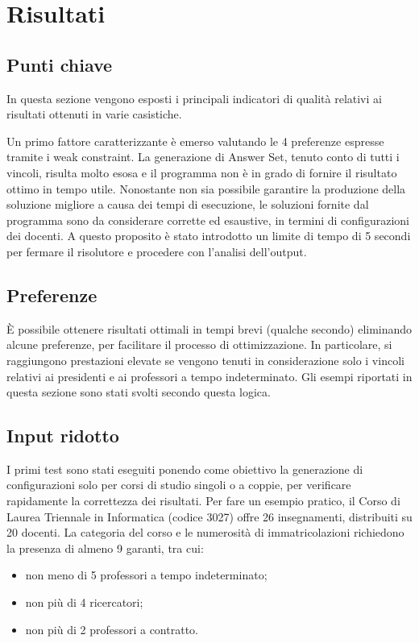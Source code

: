 \section{Risultati}

\subsection{Punti chiave}
In questa sezione vengono esposti i principali indicatori di qualità 
relativi ai risultati ottenuti in varie casistiche.

Un primo fattore caratterizzante è emerso valutando le 4 preferenze espresse 
tramite i weak constraint. La generazione di Answer Set,
tenuto conto di tutti i vincoli, risulta molto esosa e il programma non è 
in grado di fornire il risultato ottimo in tempo utile.
Nonostante non sia possibile garantire la produzione della soluzione migliore a causa
dei tempi di esecuzione, le soluzioni fornite dal programma sono da considerare 
corrette ed esaustive, in termini di configurazioni dei docenti.
A questo proposito è stato introdotto un limite di tempo di 5 secondi per 
fermare il risolutore e procedere con l'analisi dell'output.

\subsection{Preferenze}
È possibile ottenere risultati ottimali in tempi brevi (qualche secondo) eliminando alcune 
preferenze, per facilitare il processo di ottimizzazione. In particolare, si raggiungono
prestazioni elevate se vengono tenuti in considerazione solo i vincoli relativi ai 
presidenti e ai professori a tempo indeterminato.
Gli esempi riportati in questa sezione sono stati svolti secondo questa logica.

\subsection{Input ridotto}
I primi test sono stati eseguiti ponendo come obiettivo la generazione di 
configurazioni solo per corsi di studio singoli o a coppie, per verificare 
rapidamente la correttezza dei risultati.
Per fare un esempio pratico, il Corso di Laurea Triennale in Informatica (codice 3027)
offre 26 insegnamenti, distribuiti su 20 docenti.
La categoria del corso e le numerosità di immatricolazioni richiedono 
la presenza di almeno 9 garanti, tra cui:
\begin{itemize}
    \item non meno di 5 professori a tempo indeterminato;
    \item non più di 4 ricercatori;
    \item non più di 2 professori a contratto.
\end{itemize}

